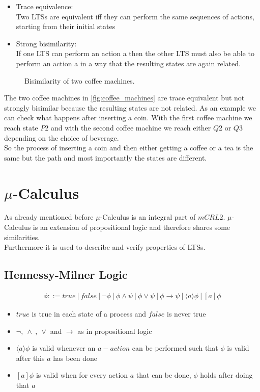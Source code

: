 \documentclass{clseminar}
\begin{document}
  \begin{itemize}[noitemsep]
    \item Trace equivalence: \\
    Two LTSs are equivalent iff they can perform the same sequences of actions, starting from their initial states \\
    \item Strong bisimilarity: \\
    If one LTS can perform an action a then the other LTS must also be able to perform an action a in a way that the resulting states are again related. \\
  \end{itemize}

  \begin{figure}[!ht]
    \resizebox{\textwidth}{!}{}
    \caption{Bisimilarity of two coffee machines.}
    \label{fig:coffee_machines}
  \end{figure}

  The two coffee machines in \autoref{fig:coffee_machines} are trace equivalent but not strongly bisimilar because the resulting states are not related. As an example we can check what happens after inserting a coin. With the first coffee machine we reach state $P2$ and with the second coffee machine we reach either $Q2$ or $Q3$ depending on the choice of beverage.\\
  So the process of inserting a coin and then either getting a coffee or a tea is the same but the path and most importantly the states are different.

  \section{$\mu$-Calculus}
  As already mentioned before $\mu$-Calculus is an integral part of $mCRL2$. $\mu$-Calculus is an extension of propositional logic and therefore shares some similarities. \\
  Furthermore it is used to describe and verify properties of LTSs.

  \subsection{Hennessy-Milner Logic}
  \begin{align*}
    \phi ::= \mathit{true}\ |\ \mathit{false}\ |\ \neg \phi\ |\ \phi \land \psi\ |\ \phi \lor \psi\ |\ \phi \to \psi\ |\ \langle a \rangle \phi \ |\ [a]\phi
  \end{align*}
  \begin{itemize}
    \item $\mathit{true}$ is true in each state of a process and $\mathit{false}$ is never true
    \item $\neg ,\ \land\ ,\ \lor$ and $\to$ as in propositional logic
    \item $\langle a \rangle \phi$ is valid whenever an $a-action$ can be performed such that $\phi$ is valid after this $a$ has been done
    \item $[a]\phi$ is valid when for every action $a$ that can be done, $\phi$ holds after doing that $a$
  \end{itemize}
\end{document}
